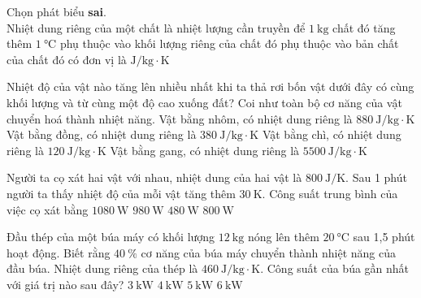 \begin{ex}
	Chọn phát biểu \textbf{sai}.\\
	Nhiệt dung riêng của một chất 
	\choice
	{là nhiệt lượng cần truyền để $\SI{1}{\kilogram}$ chất đó tăng thêm $\SI{1}{\celsius}$}
	{\True phụ thuộc vào khối lượng riêng của chất đó}
	{phụ thuộc vào bản chất của chất đó}
	{có đơn vị là $\si{\joule/\kilogram\cdot\kelvin}$}
	\loigiai{}
\end{ex}
\begin{ex}
Nhiệt độ của vật nào tăng lên nhiều nhất khi ta thả rơi bốn vật dưới đây có cùng khối lượng và từ cùng một độ cao xuống đất? Coi như toàn bộ cơ năng của vật chuyển hoá thành nhiệt năng.
	\choice
	{Vật bằng nhôm, có nhiệt dung riêng là $\SI{880}{\joule/\kilogram\cdot\kelvin}$}
	{Vật bằng đồng, có nhiệt dung riêng là $\SI{380}{\joule/\kilogram\cdot\kelvin}$}
	{\True Vật bằng chì, có nhiệt dung riêng là $\SI{120}{\joule/\kilogram\cdot\kelvin}$}
	{Vật bằng gang, có nhiệt dung riêng là $\SI{5500}{\joule/\kilogram\cdot\kelvin}$}
\end{ex}
\begin{ex}
	Người ta cọ xát hai vật với nhau, nhiệt dung của hai vật là $\SI{800}{\joule/\kelvin}$. Sau 1 phút người ta thấy nhiệt độ của mỗi vật tăng thêm $\SI{30}{\kelvin}$. Công suất trung bình của việc cọ xát bằng
	\choice
	{$\SI{1080}{\watt}$}
	{$\SI{980}{\watt}$}
	{$\SI{480}{\watt}$}
	{\True $\SI{800}{\watt}$}
\end{ex}
\begin{ex}
	Đầu thép của một búa máy có khối lượng $\SI{12}{\kilogram}$ nóng lên thêm $\SI{20}{\celsius}$ sau 1,5 phút hoạt động. Biết rằng  $\SI{40}{\percent}$ cơ năng của búa máy chuyển thành nhiệt năng của đầu búa. Nhiệt dung riêng của thép là $\SI{460}{\joule/\kilogram\cdot\kelvin}$. Công suất của búa gần nhất với giá trị nào sau đây?
	\choice
	{\True $\SI{3}{\kilo\watt}$}
	{$\SI{4}{\kilo\watt}$}
	{$\SI{5}{\kilo\watt}$}
	{$\SI{6}{\kilo\watt}$}
\end{ex}
